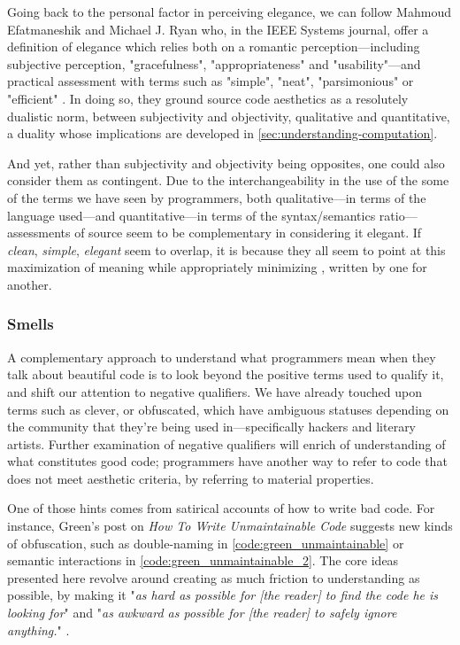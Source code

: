 Going back to the personal factor in perceiving elegance, we can follow Mahmoud Efatmaneshik and Michael J. Ryan who, in the IEEE Systems journal, offer a definition of elegance which relies both on a romantic perception—including subjective perception, "gracefulness", "appropriateness" and "usability"—and practical assessment with terms such as "simple", "neat", "parsimonious" or "efficient" \citep{efatmaneshnik_definitions_2019}. In doing so, they ground source code aesthetics as a resolutely dualistic norm, between subjectivity and objectivity, qualitative and quantitative, a duality whose implications are developed in \ref{sec:understanding-computation}.

And yet, rather than subjectivity and objectivity being opposites, one could also consider them as contingent. Due to the interchangeability in the use of the some of the terms we have seen by programmers, both qualitative—in terms of the language used—and quantitative—in terms of the syntax/semantics ratio—assessments of source seem to be complementary in considering it elegant. If \emph{clean}, \emph{simple}, \emph{elegant} seem to overlap, it is because they all seem to point at this maximization of meaning while appropriately minimizing , written by one for another.

\subsubsection{Smells}
\label{subsubsec:smells}

A complementary approach to understand what programmers mean when they talk about beautiful code is to look beyond the positive terms used to qualify it, and shift our attention to negative qualifiers. We have already touched upon terms such as clever, or obfuscated, which have ambiguous statuses depending on the community that they're being used in—specifically hackers and literary artists. Further examination of negative qualifiers will enrich of understanding of what constitutes good code; programmers have another way to refer to code that does not meet aesthetic criteria, by referring to material properties.

One of those hints comes from satirical accounts of how to write bad code. For instance, Green's post on \emph{How To Write Unmaintainable Code} suggests new kinds of obfuscation, such as double-naming in \ref{code:green_unmaintainable} or semantic interactions in \ref{code:green_unmaintainable_2}. The core ideas presented here revolve around creating as much friction to understanding as possible, by making it "\emph{as hard as possible for [the reader] to find the code he is looking for}" and "\emph{as awkward as possible for [the reader] to safely ignore anything.}" \citep{green_how_2006}.


